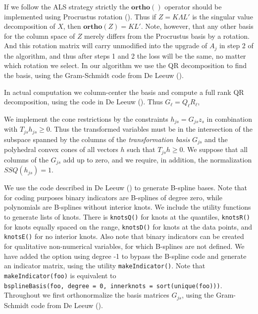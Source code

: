\documentclass[
  12pt,
  letterpaper,
]{scrbook}
\begin{document}
If we follow the ALS strategy strictly the \(\mathbf{ortho}()\) operator
should be implemented using Procrustus rotation
(). Thus if \(Z=K\Lambda L'\) is
the singular value decomposition of \(X\), then
\(\mathbf{ortho}(Z)=KL'\). Note, however, that any other basis for the
column space of \(Z\) merely differs from the Procrustus basis by a
rotation. And this rotation matrix will carry unmodified into the
upgrade of \(A_j\) in step 2 of the algorithm, and thus after steps 1
and 2 the loss will be the same, no matter which rotation we select. In
our algorithm we use the QR decomposition to find the basis, using the
Gram-Schmidt code from De Leeuw ().

In actual computation we column-center the basis and compute a full rank
QR decomposition, using the code in De Leeuw
(). Thus \(G_\ell=Q_\ell R_\ell\),

We implement the cone restrictions by the constraints
\(h_{js}=G_{js}z_s\) in combination with \(T_{js}h_{js}\geq 0\). Thus
the transformed variables must be in the intersection of the subspace
spanned by the columns of the \emph{transformation basis} \(G_{js}\) and
the polyhedral convex cones of all vectors \(h\) such that
\(T_{js}h\geq 0\). We suppose that all columns of the \(G_{js}\) add up
to zero, and we require, in addition, the normalization
\(SSQ(h_{js})=1\).

We use the code described in De Leeuw
() to generate B-spline bases. Note
that for coding purposes binary indicators are B-splines of degree zero,
while polynomials are B-splines without interior knots. We include the
utility functions to generate lists of knots. There is \texttt{knotsQ()}
for knots at the quantiles, \texttt{knotsR()} for knots equally spaced
on the range, \texttt{knotsD()} for knots at the data points, and
\texttt{knotsE()} for no interior knots. Also note that binary
indicators can be created for qualitative non-numerical variables, for
which B-splines are not defined. We have added the option using degree
-1 to bypass the B-spline code and generate an indicator matrix, using
the utility \texttt{makeIndicator()}. Note that
\texttt{\textquotesingle{}makeIndicator(foo)} is equivalent to
\texttt{bsplineBasis(foo,\ degree\ =\ 0,\ innerknots\ =\ sort(unique(foo)))}.
Throughout we first orthonormalize the basis matrices \(G_{js}\), using
the Gram-Schmidt code from De Leeuw
().
\end{document}
